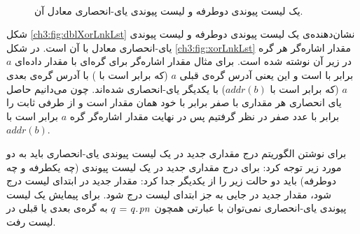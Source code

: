 
\begin{figure}
\begin{center}
\\[0.7cm]
\caption{یک لیست پیوندی دوطرفه و لیست پیوندی یای-انحصاری معادل آن.}\label{ch3:fig:dblXorLnkLst}
\end{center}
\end{figure}

شکل {\eqref{ch3:fig:dblXorLnkLst}} نشان‌دهنده‌ی یک لیست پیوندی دوطرفه و لیست پیوندی یای-انحصاری معادل با آن است. در شکل {\eqref{ch3:fig:xorLnkLst}} مقدار اشاره‌گر {} هر گره در زیر آن نوشته شده است. برای مثال مقدار اشاره‌گر {} برای گره‌ای با مقدار داده‌ای {$a$} برابر با {} است و این یعنی آدرس گره‌ی قبلی {$a$} (که برابر است با {}) با آدرس گره‌ی بعدی {$a$} (که برابر است با {$\mathit{addr}(b)$}) با یکدیگر یای-انحصاری شده‌اند. چون می‌دانیم حاصل یای انحصاری هر مقداری با صفر برابر با خود همان مقدار است و از طرفی ثابت {} را برابر با عدد صفر در نظر گرفتیم پس در نهایت مقدار اشاره‌گر {} گره {$a$} برابر است با {$\mathit{addr}(b)$}.

برای نوشتن الگوریتم درج مقداری جدید در یک لیست پیوندی یای-انحصاری باید به دو مورد زیر توجه کرد:
 برای درج مقداری جدید در یک لیست پیوندی (چه یکطرفه و چه دوطرفه) باید دو حالت زیر را از یکدیگر جدا کرد:
 مقدار جدید در ابتدای لیست درج شود، 
 مقدار جدید در جایی به جز ابتدای لیست درج شود. 
 برای پیمایش یک لیست پیوندی یای-انحصاری نمی‌توان با عبارتی همچون {$q\mathrel{\hspace{1pt}=\hspace{1pt}} q.\hspace*{1pt}\mathit{pn}$} به گره‌ی بعدی یا قبلی در لیست رفت.

